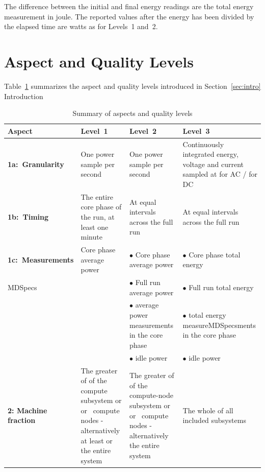 \noindent
The difference between the initial and final energy readings are the total energy measurement in joule.
The reported values after the energy has been divided by the elapsed time are watts as for Levels~1 and~2.

\section{Aspect and Quality Levels}
\label{sec:AQLevels}
\noindent
Table~\ref{tab:levels} summarizes the aspect and quality levels introduced in Section~\ref{sec:intro} Introduction

\noindent
\begin{table}
\caption{Summary of aspects and quality levels}
\label{tab:levels}
\begin{tabular}{|p{3.0cm}|p{3.5cm}|p{3.5cm}|p{3.5cm}|} \hline
\textbf{Aspect}&\textbf{Level~1}&\textbf{Level~2}&\textbf{Level~3}\\ \hline

\textbf{1a:~Granularity} &
One power sample per second &
One power sample per second &
Continuously integrated energy, voltage and current sampled at \SpecRateLThreeAC{} for AC / \SpecRateLThreeDC{} for DC \\
\hline


\textbf{1b:~Timing} &
The entire core phase of the run, at least one minute &
At equal intervals across the full run &
At equal intervals across the full run   \\
\hline

\textbf{1c:~Measurements} &
Core phase average power &
$\bullet$ Core phase average power & 
$\bullet$ Core phase total energy \\MDSpecs

 & &
$\bullet$ Full run average power &
$\bullet$ Full run total energy \\

 & &
$\bullet$ \MinMeasurementsCorePhaseLTwoThree{} average power measurements in the core phase &
$\bullet$ \MinMeasurementsCorePhaseLTwoThree{} total energy measureMDSpecsments in the core phase \\

 & &
$\bullet$ idle power &
$\bullet$ idle power \\
\hline

\textbf{2: Machine \newline fraction}  &
The greater of \SpecFracMinLOne{} of the compute subsystem or \SpecPowerMinLOne{} or \SpecMinNodes{}~compute nodes - alternatively at least \SpecPowerMaxLOne{} or the entire system &
The greater of \SpecFracMinLTwo{} of the compute-node subsystem or \SpecPowerMinLTwo{} or \SpecMinNodes{}~compute nodes - alternatively the entire system &
The whole of all included subsystems \\
\hline


\end{tabular}
\end{table}
